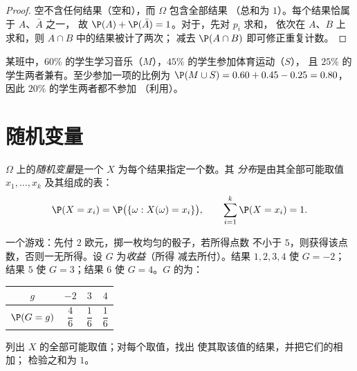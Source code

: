 \begin{proof}
空不含任何结果（空和），而 $\Omega$ 包含全部结果
（总和为 $1$）。每个结果恰属于 $A$、$\bar A$ 之一，
故 $\P(A) + \P(\bar A) = 1$。对于，先对 $p_i$ 求和，
依次在 $A$、$B$ 上求和，则 $A \cap B$ 中的结果被计了两次；
减去 $\P(A \cap B)$ 即可修正重复计数。
\end{proof}

\begin{example}
某班中，$60\%$ 的学生学习音乐（$M$），$45\%$ 的学生参加体育运动（$S$），
且 $25\%$ 的学生两者兼有。至少参加一项的比例为
$\P(M \cup S) = 0.60 + 0.45 - 0.25 = 0.80$，因此 $20\%$ 的学生两者都不参加
（利用）。
\end{example}

\section{随机变量}

\begin{definition}[随机变量与分布]\label{def:g11:prob:rv}
$\Omega$ 上的\emph{随机变量}是一个
$X$ 为每个结果指定一个数。其
\emph{分布}是由其全部可能取值
$x_1, \dots, x_k$ 及其组成的表：
\[
\P(X = x_i) = \P\bigl(\{\omega : X(\omega) = x_i\}\bigr),
\qquad
\sum_{i=1}^k \P(X = x_i) = 1 .
\]
\end{definition}

\begin{example}\label{ex:g11:prob:game}
一个游戏：先付 $2$ 欧元，掷一枚均匀的骰子，若所得点数
不小于 $5$，则获得该点数，否则一无所得。设 $G$ 为\emph{收益}（所得
减去所付）。结果 $1, 2, 3, 4$ 使 $G = -2$；结果 $5$
使 $G = 3$；结果 $6$ 使 $G = 4$。$G$ 的为：
\begin{center}
\begin{tabular}{c|ccc}
$g$ & $-2$ & $3$ & $4$\\
\hline\rule{0pt}{11pt}%
$\P(G = g)$ & $\dfrac46$ & $\dfrac16$ & $\dfrac16$
\end{tabular}
\end{center}
\end{example}

\begin{method}[构造分布表]\label{met:g11:prob:table}
列出 $X$ 的全部可能取值；对每个取值，找出
使其取该值的结果，并把它们的相加；
检验之和为 $1$。
\end{method}

